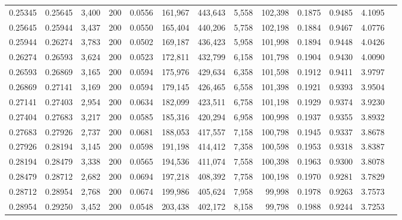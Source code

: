 \begin{tabular}{rrrrrrrrrrrrr}
0.25345 & 0.25645 &  3,400 & 200 &                                     0.0556 & 161,967 & 443,643 &   5,558 & 102,398 & 0.1875 & 0.9485 & 4.1095 \\
0.25645 & 0.25944 &  3,437 & 200 &                                     0.0550 & 165,404 & 440,206 &   5,758 & 102,198 & 0.1884 & 0.9467 & 4.0776 \\
0.25944 & 0.26274 &  3,783 & 200 &                                     0.0502 & 169,187 & 436,423 &   5,958 & 101,998 & 0.1894 & 0.9448 & 4.0426 \\
0.26274 & 0.26593 &  3,624 & 200 &                                     0.0523 & 172,811 & 432,799 &   6,158 & 101,798 & 0.1904 & 0.9430 & 4.0090 \\
0.26593 & 0.26869 &  3,165 & 200 &                                     0.0594 & 175,976 & 429,634 &   6,358 & 101,598 & 0.1912 & 0.9411 & 3.9797 \\
0.26869 & 0.27141 &  3,169 & 200 &                                     0.0594 & 179,145 & 426,465 &   6,558 & 101,398 & 0.1921 & 0.9393 & 3.9504 \\
0.27141 & 0.27403 &  2,954 & 200 &                                     0.0634 & 182,099 & 423,511 &   6,758 & 101,198 & 0.1929 & 0.9374 & 3.9230 \\
0.27404 & 0.27683 &  3,217 & 200 &                                     0.0585 & 185,316 & 420,294 &   6,958 & 100,998 & 0.1937 & 0.9355 & 3.8932 \\
0.27683 & 0.27926 &  2,737 & 200 &                                     0.0681 & 188,053 & 417,557 &   7,158 & 100,798 & 0.1945 & 0.9337 & 3.8678 \\
0.27926 & 0.28194 &  3,145 & 200 &                                     0.0598 & 191,198 & 414,412 &   7,358 & 100,598 & 0.1953 & 0.9318 & 3.8387 \\
0.28194 & 0.28479 &  3,338 & 200 &                                     0.0565 & 194,536 & 411,074 &   7,558 & 100,398 & 0.1963 & 0.9300 & 3.8078 \\
0.28479 & 0.28712 &  2,682 & 200 &                                     0.0694 & 197,218 & 408,392 &   7,758 & 100,198 & 0.1970 & 0.9281 & 3.7829 \\
0.28712 & 0.28954 &  2,768 & 200 &                                     0.0674 & 199,986 & 405,624 &   7,958 &  99,998 & 0.1978 & 0.9263 & 3.7573 \\
0.28954 & 0.29250 &  3,452 & 200 &                                     0.0548 & 203,438 & 402,172 &   8,158 &  99,798 & 0.1988 & 0.9244 & 3.7253 \\

\end{tabular}
